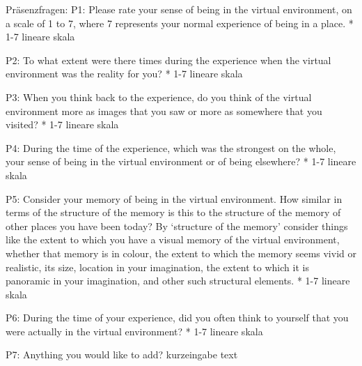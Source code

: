 Präsenzfragen:
P1: Please rate your sense of being in the virtual environment, on a scale of 1 to 7, where 7 represents your normal experience of being in a place. *
1-7 lineare skala

P2: To what extent were there times during the experience when the virtual environment was the reality for you? *
1-7 lineare skala

P3: When you think back to the experience, do you think of the virtual environment more as images that you saw or more as somewhere that you visited? *
1-7 lineare skala

P4: During the time of the experience, which was the strongest on the whole, your sense of being in the virtual environment or of being elsewhere? *
1-7 lineare skala

P5: Consider your memory of being in the virtual environment. How similar in terms of the structure of the memory is this to the structure of the memory of other places you have been today? By ‘structure of the memory’ consider things like the extent to which you have a visual memory of the virtual environment, whether that memory is in colour, the extent to which the memory seems vivid or realistic, its size, location in your imagination, the extent to which it is panoramic in your imagination, and other such structural elements. *
1-7 lineare skala


P6: During the time of your experience, did you often think to yourself that you were actually in the virtual environment? *
1-7 lineare skala

P7: Anything you would like to add?
kurzeingabe text

